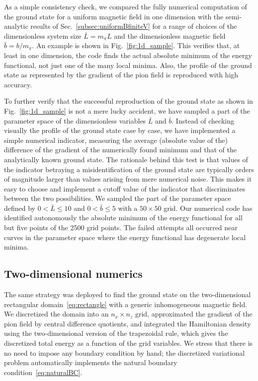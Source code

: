 \documentclass[pdflatex,iicol,sn-mathphys-num]{sn-jnl}
\newcommand{\bmag}{b}%
\begin{document}
As a simple consistency check, we compared the fully numerical computation of the ground state for a uniform magnetic field in one dimension with the semi-analytic results of Sec.~\ref{subsec:uniformBfiniteV} for a range of choices of the dimensionless system size $\bar L=m_\pi L$ and the dimensionless magnetic field $\bar\bmag=\bmag/m_\pi$. An example is shown in Fig.~\ref{fig:1d_sample}. This verifies that, at least in one dimension, the code finds the actual absolute minimum of the energy functional, not just one of the many local minima. Also, the profile of the ground state as represented by the gradient of the pion field is reproduced with high accuracy.

To further verify that the successful reproduction of the ground state as shown in Fig.~\ref{fig:1d_sample} is not a mere lucky accident, we have sampled a part of the parameter space of the dimensionless variables $\bar L$ and $\bar\bmag$. Instead of checking visually the profile of the ground state case by case, we have implemented a simple numerical indicator, measuring the average (absolute value of the) difference of the gradient of the numerically found minimum and that of the analytically known ground state. The rationale behind this test is that values of the indicator betraying a misidentification of the ground state are typically orders of magnitude larger than values arising from mere numerical noise. This makes it easy to choose and implement a cutoff value of the indicator that discriminates between the two possibilities. We sampled the part of the parameter space defined by $0<\bar L\leq10$ and $0<\bar\bmag\leq5$ with a $50\times50$ grid. Our numerical code has identified autonomously the absolute minimum of the energy functional for all but five points of the 2500 grid points. The failed attempts all occurred near curves in the parameter space where the energy functional has degenerate local minima.


\subsection{Two-dimensional numerics}
\label{subsec:nonuniformBnonzeroMsample}

The same strategy was deployed to find the ground state on the two-dimensional rectangular domain~\eqref{eq:rectangle} with a generic inhomogeneous magnetic field. We discretized the domain into an $n_x\times n_z$ grid, approximated the gradient of the pion field by central difference quotients, and integrated the Hamiltonian density using the two-dimensional version of the trapezoidal rule, which gives the discretized total energy as a function of the grid variables. We stress that there is no need to impose any boundary condition by hand; the discretized variational problem automatically implements the natural boundary condition~\eqref{eq:naturalBC}.
\end{document}

